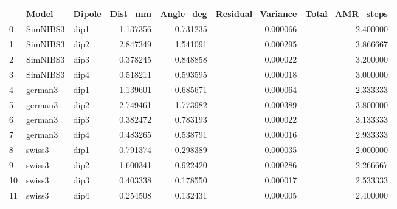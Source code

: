 \begin{tabular}{lllrrrr}
\toprule
{} &     Model & Dipole &   Dist\_mm &  Angle\_deg &  Residual\_Variance &  Total\_AMR\_steps \\
\midrule
0  &  SimNIBS3 &   dip1 &  1.137356 &   0.731235 &           0.000066 &         2.400000 \\
1  &  SimNIBS3 &   dip2 &  2.847349 &   1.541091 &           0.000295 &         3.866667 \\
2  &  SimNIBS3 &   dip3 &  0.378245 &   0.848858 &           0.000022 &         3.200000 \\
3  &  SimNIBS3 &   dip4 &  0.518211 &   0.593595 &           0.000018 &         3.000000 \\
4  &   german3 &   dip1 &  1.139601 &   0.685671 &           0.000064 &         2.333333 \\
5  &   german3 &   dip2 &  2.749461 &   1.773982 &           0.000389 &         3.800000 \\
6  &   german3 &   dip3 &  0.382472 &   0.783193 &           0.000022 &         3.133333 \\
7  &   german3 &   dip4 &  0.483265 &   0.538791 &           0.000016 &         2.933333 \\
8  &    swiss3 &   dip1 &  0.791374 &   0.298389 &           0.000035 &         2.000000 \\
9  &    swiss3 &   dip2 &  1.600341 &   0.922420 &           0.000286 &         2.266667 \\
10 &    swiss3 &   dip3 &  0.403338 &   0.178550 &           0.000017 &         2.533333 \\
11 &    swiss3 &   dip4 &  0.254508 &   0.132431 &           0.000005 &         2.400000 \\
\bottomrule
\end{tabular}


